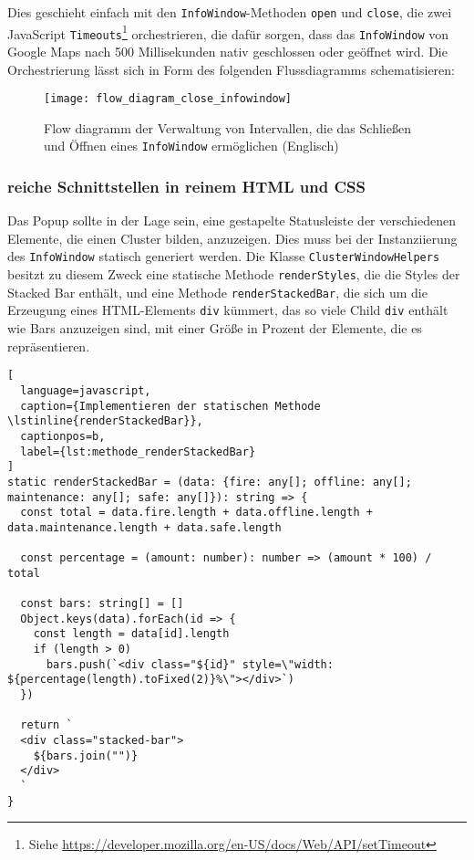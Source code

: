 Dies geschieht einfach mit den \lstinline{InfoWindow}-Methoden \lstinline{open} und \lstinline{close}, die zwei JavaScript \lstinline{Timeouts}\footnote{Siehe \href{https://developer.mozilla.org/en-US/docs/Web/API/setTimeout}{https://developer.mozilla.org/en-US/docs/Web/API/setTimeout}} orchestrieren, die dafür sorgen, dass das \lstinline{InfoWindow} von Google Maps nach 500 Millisekunden nativ geschlossen oder geöffnet wird.
Die Orchestrierung lässt sich in Form des folgenden Flussdiagramms schematisieren:

\begin{figure}[H]
  \centering
  \texttt{[image: flow\_diagram\_close\_infowindow]}
  \caption{Flow diagramm der Verwaltung von Intervallen, die das Schließen und Öffnen eines \lstinline{InfoWindow} ermöglichen (Englisch)}
  \label{fig:flow_diagram_close_infowindow}
\end{figure}

\subsubsection{reiche Schnittstellen in reinem \ac{HTML} und \ac{CSS}}

Das Popup sollte in der Lage sein, eine gestapelte Statusleiste der verschiedenen Elemente, die einen Cluster bilden, anzuzeigen.
Dies muss bei der Instanziierung des \lstinline{InfoWindow} statisch generiert werden.
Die Klasse \lstinline{ClusterWindowHelpers} besitzt zu diesem Zweck eine statische Methode \lstinline{renderStyles}, die die Styles der Stacked Bar enthält, und eine Methode \lstinline{renderStackedBar}, die sich um die Erzeugung eines HTML-Elements \lstinline{div} kümmert, das so viele Child \lstinline{div} enthält wie Bars anzuzeigen sind, mit einer Größe in Prozent der Elemente, die es repräsentieren.

\begin{lstlisting}[
  language=javascript,
  caption={Implementieren der statischen Methode \lstinline{renderStackedBar}},
  captionpos=b,
  label={lst:methode_renderStackedBar}
]
static renderStackedBar = (data: {fire: any[]; offline: any[]; maintenance: any[]; safe: any[]}): string => {
  const total = data.fire.length + data.offline.length + data.maintenance.length + data.safe.length

  const percentage = (amount: number): number => (amount * 100) / total

  const bars: string[] = []
  Object.keys(data).forEach(id => {
    const length = data[id].length
    if (length > 0)
      bars.push(`<div class="${id}" style=\"width: ${percentage(length).toFixed(2)}%\"></div>`)
  })

  return `
  <div class="stacked-bar">
    ${bars.join("")}
  </div>
  `
}
\end{lstlisting}

